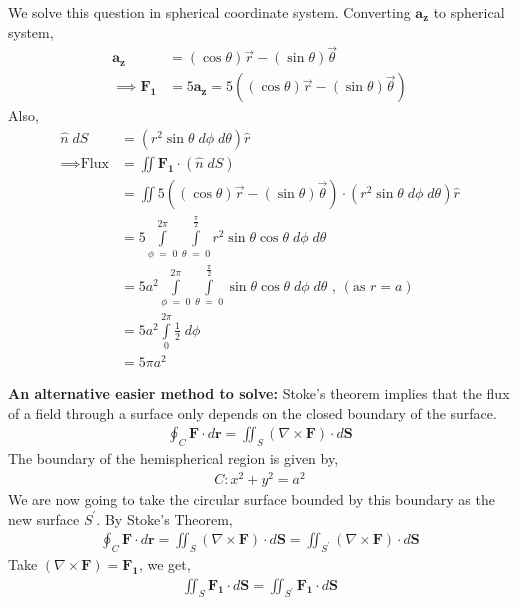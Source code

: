 \documentclass[12pt]{article}
\providecommand{\brak}[1]{\ensuremath{\left(#1\right)}}
\begin{document}
We solve this question in spherical coordinate system. 
Converting $\mathbf{a_z}$ to spherical system,
\begin{align*}
    \mathbf{a_z} &= \brak{\cos{\theta}} \vec{r} - \brak{\sin{\theta}} \vec{\theta}\\
    \implies \mathbf{F_1} &= 5 \mathbf{a_z} = 5 \brak{\brak{\cos{\theta}} \vec{r} - \brak{\sin{\theta}} \vec{\theta}}
\end{align*}
Also,
\begin{align*}
    \hat{n}\; dS &= \brak{r^2\sin{\theta}\; d\phi \; d\theta} \hat{r}\\
    \implies \text{Flux} &= \iint \mathbf{F_1}\cdot\brak{\hat{n} \; dS}\\
    &= \iint 5 \brak{\brak{\cos{\theta}} \vec{r} - \brak{\sin{\theta}} \vec{\theta}} \cdot \brak{r^2\sin{\theta}\; d\phi \; d\theta} \hat{r}\\
    &= 5\int\limits_{\phi \;=\; 0}^{2\pi}\int\limits_{\theta \;=\; 0}^{\frac{\pi}{2}} r^2 \sin{\theta} \cos{\theta} \; d\phi \; d\theta\\
    &= 5a^2 \int\limits_{\phi \;=\; 0}^{2\pi}\int\limits_{\theta \;=\; 0}^{\frac{\pi}{2}} \sin{\theta} \cos{\theta} \; d\phi \; d\theta \text{ , } \brak{\text{as } r = a}\\
    &= 5a^2 \int\limits_{0}^{2\pi} \frac{1}{2} \; d\phi\\
    &= 5\pi a^2
\end{align*}

\textbf{An alternative easier method to solve:} \newline
Stoke's theorem implies that the flux of a field through a surface only depends on the closed boundary of the surface.
\begin{align*}
\oint_C \mathbf{F} \cdot d\mathbf{r} = \iint_S (\nabla \times \mathbf{F}) \cdot d\mathbf{S}
\end{align*}
The boundary of the hemispherical region is given by,
\begin{align*}
    C: x^2 + y^2 = a^2
\end{align*}
We are now going to take the circular surface bounded by this boundary as the new surface $S^\prime$. By Stoke's Theorem,
\begin{align*}
    \oint_C \mathbf{F} \cdot d\mathbf{r} = \iint_S (\nabla \times \mathbf{F}) \cdot d\mathbf{S} = \iint_{S^\prime} (\nabla \times \mathbf{F}) \cdot d\mathbf{S}
\end{align*}
Take $\brak{\nabla \times \mathbf{F}} = \mathbf{F_1}$, we get,
\begin{align*}
     \iint_S \mathbf{F_1} \cdot d\mathbf{S} = \iint_{S^\prime} \mathbf{F_1} \cdot d\mathbf{S}
\end{align*}
\end{document}
